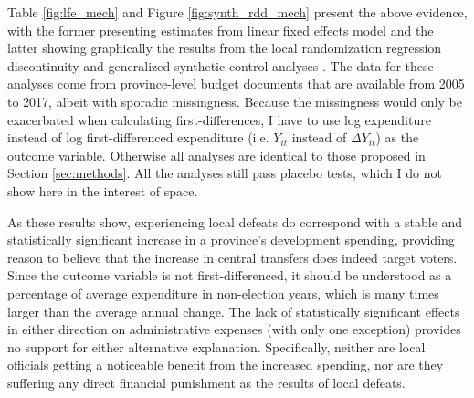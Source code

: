 \documentclass[12pt]{article}
\newcommand{\1}{\mathbbm{1}}
\begin{document}
Table \ref{fig:lfe_mech} and Figure \ref{fig:synth_rdd_mech} present the above evidence, with the former presenting estimates from linear fixed effects model and the latter showing graphically the results from the local randomization regression discontinuity \cite{CattaneoTitiunik2015} and generalized synthetic control analyses \cite{Xu2017gsynth}. The data for these analyses come from province-level budget documents that are available from 2005 to 2017, albeit with sporadic missingness. Because the missingness would only be exacerbated when calculating first-differences, I have to use log expenditure instead of log first-differenced expenditure (i.e. $Y_{it}$ instead of $\Delta Y_{it}$) as the outcome variable. Otherwise all analyses are identical to those proposed in Section \ref{sec:methods}. All the analyses still pass placebo tests, which I do not show here in the interest of space.

As these results show, experiencing local defeats do correspond with a stable and statistically significant increase in a province's development spending, providing reason to believe that the increase in central transfers does indeed target voters. Since the outcome variable is not first-differenced, it should be understood as a percentage of average expenditure in non-election years, which is many times larger than the average annual change.  The lack of statistically significant effects in either direction on administrative expenses (with only one exception) provides no support for either alternative explanation. Specifically, neither are local officials getting a noticeable benefit from the increased spending, nor are they suffering any direct financial punishment as the results of local defeats.


\end{document}
